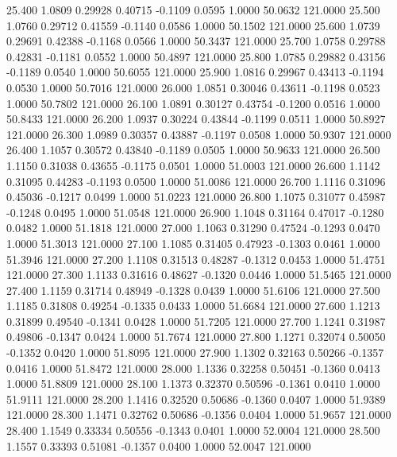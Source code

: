   25.400   1.0809   0.29928   0.40715  -0.1109   0.0595   1.0000  50.0632 121.0000
  25.500   1.0760   0.29712   0.41559  -0.1140   0.0586   1.0000  50.1502 121.0000
  25.600   1.0739   0.29691   0.42388  -0.1168   0.0566   1.0000  50.3437 121.0000
  25.700   1.0758   0.29788   0.42831  -0.1181   0.0552   1.0000  50.4897 121.0000
  25.800   1.0785   0.29882   0.43156  -0.1189   0.0540   1.0000  50.6055 121.0000
  25.900   1.0816   0.29967   0.43413  -0.1194   0.0530   1.0000  50.7016 121.0000
  26.000   1.0851   0.30046   0.43611  -0.1198   0.0523   1.0000  50.7802 121.0000
  26.100   1.0891   0.30127   0.43754  -0.1200   0.0516   1.0000  50.8433 121.0000
  26.200   1.0937   0.30224   0.43844  -0.1199   0.0511   1.0000  50.8927 121.0000
  26.300   1.0989   0.30357   0.43887  -0.1197   0.0508   1.0000  50.9307 121.0000
  26.400   1.1057   0.30572   0.43840  -0.1189   0.0505   1.0000  50.9633 121.0000
  26.500   1.1150   0.31038   0.43655  -0.1175   0.0501   1.0000  51.0003 121.0000
  26.600   1.1142   0.31095   0.44283  -0.1193   0.0500   1.0000  51.0086 121.0000
  26.700   1.1116   0.31096   0.45036  -0.1217   0.0499   1.0000  51.0223 121.0000
  26.800   1.1075   0.31077   0.45987  -0.1248   0.0495   1.0000  51.0548 121.0000
  26.900   1.1048   0.31164   0.47017  -0.1280   0.0482   1.0000  51.1818 121.0000
  27.000   1.1063   0.31290   0.47524  -0.1293   0.0470   1.0000  51.3013 121.0000
  27.100   1.1085   0.31405   0.47923  -0.1303   0.0461   1.0000  51.3946 121.0000
  27.200   1.1108   0.31513   0.48287  -0.1312   0.0453   1.0000  51.4751 121.0000
  27.300   1.1133   0.31616   0.48627  -0.1320   0.0446   1.0000  51.5465 121.0000
  27.400   1.1159   0.31714   0.48949  -0.1328   0.0439   1.0000  51.6106 121.0000
  27.500   1.1185   0.31808   0.49254  -0.1335   0.0433   1.0000  51.6684 121.0000
  27.600   1.1213   0.31899   0.49540  -0.1341   0.0428   1.0000  51.7205 121.0000
  27.700   1.1241   0.31987   0.49806  -0.1347   0.0424   1.0000  51.7674 121.0000
  27.800   1.1271   0.32074   0.50050  -0.1352   0.0420   1.0000  51.8095 121.0000
  27.900   1.1302   0.32163   0.50266  -0.1357   0.0416   1.0000  51.8472 121.0000
  28.000   1.1336   0.32258   0.50451  -0.1360   0.0413   1.0000  51.8809 121.0000
  28.100   1.1373   0.32370   0.50596  -0.1361   0.0410   1.0000  51.9111 121.0000
  28.200   1.1416   0.32520   0.50686  -0.1360   0.0407   1.0000  51.9389 121.0000
  28.300   1.1471   0.32762   0.50686  -0.1356   0.0404   1.0000  51.9657 121.0000
  28.400   1.1549   0.33334   0.50556  -0.1343   0.0401   1.0000  52.0004 121.0000
  28.500   1.1557   0.33393   0.51081  -0.1357   0.0400   1.0000  52.0047 121.0000
